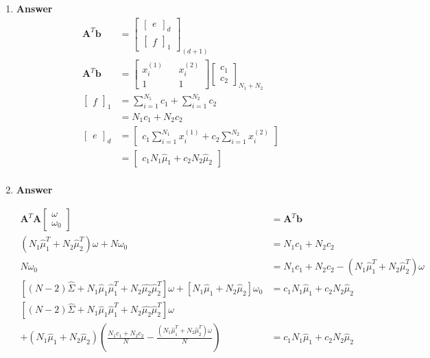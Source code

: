 \documentclass[11pt]{article}
\begin{document}
\begin{enumerate}[label=(\alph*)]
\begin{enumerate}[label=(\roman*)]
\item  \textbf{Answer}
\begin{align*}
 \mathbf{A}^T \mathbf{b}  &=
\begin{bmatrix}
\begin{bmatrix}
e
\end{bmatrix}_{d}
\\
\begin{bmatrix}
f
\end{bmatrix}_{1}
\end{bmatrix}_{(d+1)}  
\\
 \mathbf{A}^T \mathbf{b}  &=
\begin{bmatrix}
x_i^{(1)} && x_i^{(2)} \\
1 && 1
\end{bmatrix}
\begin{bmatrix}
c_1 \\
c_2
\end{bmatrix}_{N_1+N_2} \\
\begin{bmatrix}
f
\end{bmatrix}_{1} &= \sum_{i=1}^{N_1}c_1 +\sum_{i=1}^{N_2}c_2 \\
&= N_1c_1+N_2c_2 \\
\begin{bmatrix}
e
\end{bmatrix}_{d} &= 
\begin{bmatrix}
c_1\sum_{i=1}^{N_1}{x_i^{(1)}} + c_2\sum_{i=1}^{N_2}{x_i^{(2)}}
\end{bmatrix} \\
 &= 
\begin{bmatrix}
c_1N_1\hat{\mu}_1 +c_2N_2\hat{\mu}_2
\end{bmatrix} \\
\end{align*}

\newpage

\item  \textbf{Answer}

\begin{align*}
\mathbf{A}^T \mathbf{A}  
\begin{bmatrix}
\omega \\ \omega_0
\end{bmatrix}  &= 
\mathbf{A}^T \mathbf{b} \\
(N_1\hat{\mu}_1^T+N_2\hat{\mu}_2^T)\omega + N\omega_0 &= N_1c_1+N_2c_2\\
N\omega_0 &= N_1c_1+N_2c_2-(N_1\hat{\mu}_1^T+N_2\hat{\mu}_2^T)\omega\\
[(N-2)\hat{\Sigma}+N_1\hat{\mu}_1\hat{\mu}_1^T+N_2\hat{ \mu_2}\hat{\mu}_2^T]\omega
+[N_1\hat{\mu}_1+N_2\hat{\mu}_2]\omega_0 &= c_1N_1\hat{\mu}_1 +c_2N_2\hat{\mu}_2 \\
[(N-2)\hat{\Sigma}+N_1\hat{\mu}_1\hat{\mu}_1^T+N_2\hat{ \mu_2}\hat{\mu}_2^T]\omega \\
+(N_1\hat{\mu}_1+N_2\hat{\mu}_2)
(\frac{N_1c_1+N_2c_2}{N} 
-\frac{(N_1\hat{\mu}_1^T+N_2\hat{\mu}_2^T)\omega}{N} )
&= c_1N_1\hat{\mu}_1 +c_2N_2\hat{\mu}_2 \\
\end{align*}


\end{enumerate}
\end{enumerate}
\end{document}
